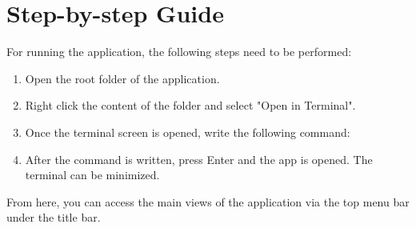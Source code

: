 \documentclass[12pt,a4paper,twoside]{report}
\begin{document}
\section{Step-by-step Guide}
	For running the application, the following steps need to be performed:
	\begin{enumerate}
	\item Open the root folder of the application.
	\item Right click the content of the folder and select "Open in Terminal".
	\item Once the terminal screen is opened, write the following command: 
	
	\item After the command is written, press Enter and the app is opened. The terminal can be minimized.
	\end{enumerate}
	
From here, you can access the main views of the application via the top menu bar under the title bar.
\end{document}
